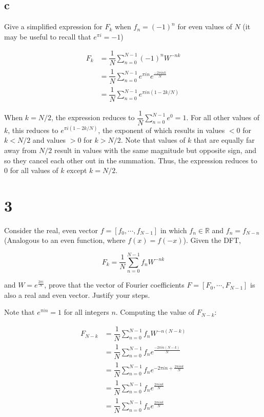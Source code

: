 \documentclass[11pt]{article}
\begin{document}
\subsection{c} Give a simplified expression for $F_k$ when $f_n = (-1)^n$ for even values of $N$ (it may be useful to recall that $e^{\pi i} = -1$)

\begin{align*}
  F_k &= \dfrac{1}{N} \sum_{n=0}^{N-1} (-1)^n W^{-nk} \\
  &= \dfrac{1}{N} \sum_{n=0}^{N-1}  e^{\pi i n} e^{\frac{- 2 \pi i n k}{N}} \\
  &= \dfrac{1}{N} \sum_{n=0}^{N-1}  e^{\pi i n (1 -2k/N)}
\end{align*}

When $k = N/2$, the expression reduces to $\dfrac{1}{N} \sum_{n=0}^{N-1}  e^{0} = 1$. For all other values of $k$, this reduces to $e^{\pi i (1 - 2k/N)}$, the exponent of which results in values $< 0$ for $k < N/2$ and values $> 0$ for $k > N/2$. Note that values of $k$ that are equally far away from $N/2$ result in values with the same magnitude but opposite sign, and so they cancel each other out in the summation. Thus, the expression reduces to $0$ for all values of $k$ except $k = N/2$.

\newpage

\section{3}

Consider the real, even vector $f = [f_0, \cdots, f_{N-1}]$ in which $f_n \in \mathbb{R}$ and $f_n = f_{N-n}$ (Analogous to an even function, where $f(x) = f(-x)$). Given the DFT,

\[ F_k = \dfrac{1}{N} \sum_{n=0}^{N-1} f_n W^{-nk} \]

and $W = e^{\frac{2 \pi i}{N}}$, prove that the vector of Fourier coefficients $F = [F_0, \cdots, F_{N-1}]$ is also a real and even vector. Justify your steps.

Note that $e^{\pi i n} = 1$ for all integers $n$. Computing the value of $F_{N-k}$:

\begin{align*}
  F_{N-k} &= \dfrac{1}{N} \sum_{n=0}^{N-1} f_n W^{-n(N-k)} \\
  &= \dfrac{1}{N} \sum_{n=0}^{N-1} f_n e^{\frac{- 2 \pi i n (N - k)}{N}} \\
  &= \dfrac{1}{N} \sum_{n=0}^{N-1} f_n e^{-2 \pi i n + \frac{2 \pi i n k}{N}} \\
  &= \dfrac{1}{N} \sum_{n=0}^{N-1} f_n e^{\frac{2 \pi i n k}{N}} \\
  &= \dfrac{1}{N} \sum_{n=0}^{N-1} f_n e^{\frac{2 \pi i n k}{N}} \\
\end{align*}
\end{document}

